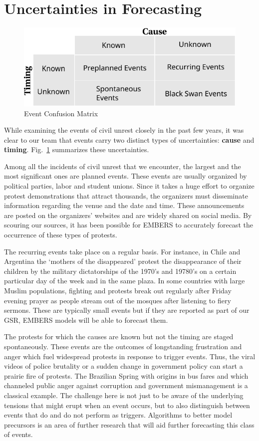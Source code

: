 \section{Uncertainties in Forecasting}
\begin{figure}
\includegraphics[width=\columnwidth]{figures/cu/event_confusionMatrix}
\caption{Event Confusion Matrix}
\label{rumsfeld}
\end{figure}

While examining the events of civil unrest closely
in the past few years, it was clear to our
team that events carry two distinct types of uncertainties: {\bf cause}
and {\bf timing}.
Fig.~\ref{rumsfeld} summarizes these uncertainties.

Among all the incidents of civil unrest that we encounter, the largest and the most significant ones
are planned events.  These events are usually organized by political parties, labor and student unions.
Since it takes a huge effort to organize protest demonstrations that
attract thousands, the organizers must disseminate information regarding the venue
and the date and time.  These announcements are posted on the organizers’ websites and
are widely shared on social media.  By scouring our sources,
it has been possible for EMBERS to accurately forecast the occurrence of these types of protests.

The recurring events take place on a regular basis.  For instance, in Chile and Argentina the
`mothers of the disappeared' protest the disappearance of their children by the military dictatorships
of the 1970's and 19780's on a certain particular day of the week and in the same plaza.
In some countries with large Muslim populations, fighting and protests break out regularly after
Friday evening prayer as people stream out of the mosques after listening
to fiery sermons. These are typically small events but if they are reported as part of our GSR,
EMBERS models will be able to forecast them.

The protests for which the causes are known but not the timing are staged spontaneously.  These
events are the outcomes of longstanding frustration and anger which fuel widespread
protests in response to trigger events.  Thus, the viral videos of police brutality or
a sudden change in government policy can start a prairie fire of protests.  The Brazilian
Spring with origins in bus fares and which channeled
public anger against corruption and government mismanagement is a classical example. The challenge here
is not just to be aware of the underlying tensions that might erupt when an event occurs, but to also
distinguish between events that do and do not perform as triggers. Algorithms to better model
precursors is an area of further research that will aid further forecasting this class of events.

